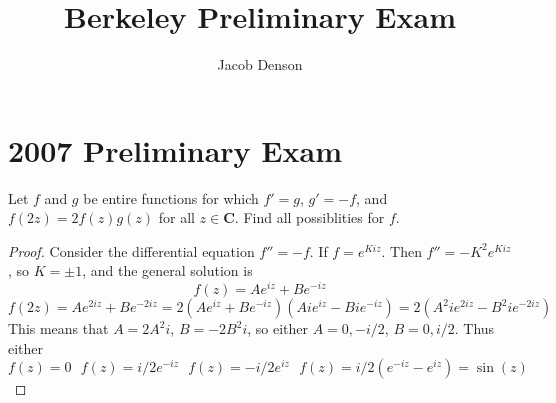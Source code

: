 

\title{Berkeley Preliminary Exam}
\author{Jacob Denson}



\maketitle
\tableofcontents
{}

\chapter{2007 Preliminary Exam}

\begin{exercise}
    Let $f$ and $g$ be entire functions for which $f' = g$, $g' = -f$, and $f(2z) = 2f(z)g(z)$ for all $z \in \mathbf{C}$. Find all possiblities for $f$.
\end{exercise}
\begin{proof}
    Consider the differential equation $f'' = -f$. If $f = e^{Kiz}$. Then $f'' = - K^2 e^{Kiz}$, so $K = \pm 1$, and the general solution is
    \[  f(z) = A e^{iz} + B e^{-iz} \]
    \[ f(2z) = A e^{2iz} + B e^{-2iz} = 2(A e^{iz} + B e^{-iz})(Ai e^{iz} - Bi e^{-iz}) = 2(A^2ie^{2iz} - B^2i e^{-2iz}) \]
    This means that $A = 2A^2i$, $B = -2B^2i$, so either $A = 0, -i/2$, $B = 0, i/2$. Thus either
    \[ f(z) = 0\ \ \ f(z) = i/2 e^{-iz}\ \ \ f(z) = -i/2 e^{iz}\ \ \ f(z) = i/2(e^{-iz} - e^{iz}) = \sin(z) \]
\end{proof}

